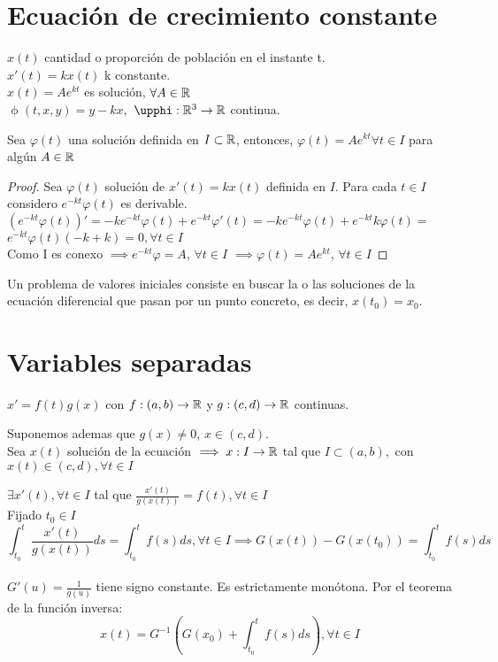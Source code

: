 \section{Ecuación de crecimiento constante}

$x(t)$ cantidad o proporción de población en el instante t.\\
$x'(t) = kx(t)$ k constante.\\
$x(t) = Ae^{kt}$ es solución, $\forall A \in \mathbb{R}$\\
$\upphi(t,x,y)= y - kx,$    $ \upphi:\R^3 \to \R$ continua.\\

\begin{nth}
Sea $\varphi(t)$ una solución definida en $I\subset \mathbb{R}$, entonces, $\varphi (t) = Ae^{kt} \forall t \in I$ para algún $A\in \mathbb{R}$

\end{nth}

\begin{proof}
Sea $\varphi(t)$ solución de $x'(t) = kx(t)$ definida en $I$. Para cada $t\in I$ considero $e^{-kt}\varphi (t)$ es derivable.\\
$(e^{-kt}\varphi (t))' = -ke^{-kt}\varphi (t) + e^{-kt}\varphi' (t) = -ke^{-kt}\varphi (t) + e^{-kt}k\varphi (t) =$\\$ e^{-kt}\varphi (t) (-k+k) = 0, \forall t \in I$\\
Como I es conexo $\implies e^{-kt}\varphi = A$, $\forall t \in I$ $\implies \varphi(t)=Ae^{kt}$, $\forall t \in I$
\end{proof}


Un problema de valores iniciales consiste en buscar la o las soluciones de la ecuación diferencial que pasan por un punto concreto, es decir, $x(t_0)=x_0$.

\section{Variables separadas}

$x' = f(t)g(x)$ con $f:(a,b)\to \mathbb{R}$ y $g:(c,d) \to \mathbb{R}$ continuas.

Suponemos ademas que $g(x) \neq 0$, $x\in (c,d)$.\\
Sea $x(t)$ solución de la ecuación $\implies x:I \to \mathbb{R}$ tal que $I\subset (a,b),$ con $ x(t)\in (c,d), \forall t \in I$

$\exists x'(t), \forall t \in I$ tal que $\frac{x'(t)}{g(x(t))} = f(t), \forall t \in I$\\
Fijado $t_0 \in I$\\
\[\int_{t_0}^{t}\frac{x'(t)}{g(x(t))} ds = \int_{t_0}^{t} f(s) ds, \forall t \in I \implies G(x(t)) - G(x(t_0)) = \int_{t_0}^{t}f(s) ds\] \\
$G'(u) = \frac{1}{g(u)}$ tiene signo constante. Es estrictamente monótona. Por el teorema de la función inversa:
\[x(t) = G^{-1}(G(x_0) + \int_{t_0}^{t}f(s) ds), \forall t \in I\]

